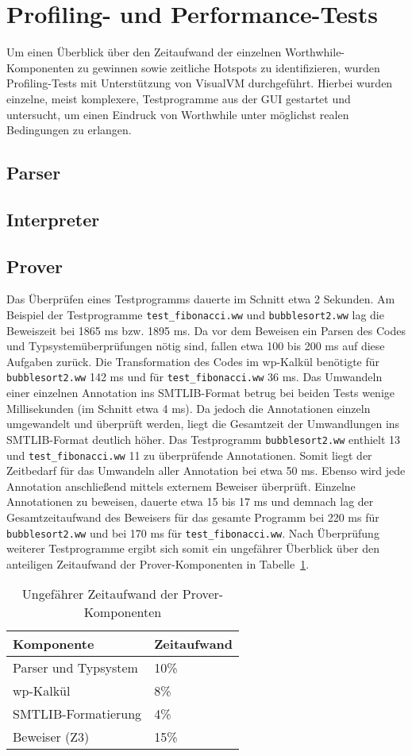 \section{Profiling- und Performance-Tests}
Um einen Überblick über den Zeitaufwand der einzelnen Worthwhile-Komponenten zu gewinnen sowie zeitliche Hotspots zu identifizieren, wurden Profiling-Tests mit Unterstützung von VisualVM durchgeführt. Hierbei wurden einzelne, meist komplexere, Testprogramme aus der GUI gestartet und untersucht, um einen Eindruck von Worthwhile unter möglichst realen Bedingungen zu erlangen.

\subsection{Parser}

\subsection{Interpreter}

\subsection{Prover}
Das Überprüfen eines Testprogramms dauerte im Schnitt etwa 2 Sekunden. Am Beispiel der Testprogramme \texttt{test\_fibonacci.ww} und \texttt{bubblesort2.ww} lag die Beweiszeit bei 1865 ms bzw. 1895 ms. Da vor dem Beweisen ein Parsen des Codes und Typsystemüberprüfungen nötig sind, fallen etwa 100 bis 200 ms auf diese Aufgaben zurück. Die Transformation des Codes im wp-Kalkül benötigte für \texttt{bubblesort2.ww} 142 ms und für \texttt{test\_fibonacci.ww} 36 ms. Das Umwandeln einer einzelnen Annotation ins SMTLIB-Format betrug bei beiden Tests wenige Millisekunden (im Schnitt etwa 4 ms). Da jedoch die Annotationen einzeln umgewandelt und überprüft werden, liegt die Gesamtzeit der Umwandlungen ins SMTLIB-Format deutlich höher. Das Testprogramm \texttt{bubblesort2.ww} enthielt 13 und \texttt{test\_fibonacci.ww} 11 zu überprüfende Annotationen. Somit liegt der Zeitbedarf für das Umwandeln aller Annotation bei etwa 50 ms. Ebenso wird jede Annotation anschließend mittels externem Beweiser überprüft. Einzelne Annotationen zu beweisen, dauerte etwa 15 bis 17 ms und demnach lag der Gesamtzeitaufwand des Beweisers für das gesamte Programm bei 220 ms für \texttt{bubblesort2.ww} und bei 170 ms für \texttt{test\_fibonacci.ww}. Nach Überprüfung weiterer Testprogramme ergibt sich somit ein ungefährer Überblick über den anteiligen Zeitaufwand der Prover-Komponenten in Tabelle~\ref{zeitaufwandprover}.
\begin{table}[h]
\centering
\caption{Ungefährer Zeitaufwand der Prover-Komponenten}
\label{zeitaufwandprover}
\begin{tabular}{|l|l|}
\hline
\textbf{Komponente} & \textbf{Zeitaufwand} \\
\hline
Parser und Typsystem & 10\% \\
\hline
wp-Kalkül & 8\% \\
\hline
SMTLIB-Formatierung & 4\% \\
\hline
Beweiser (Z3) & 15\% \\
\hline
\end{tabular}
\end{table}
